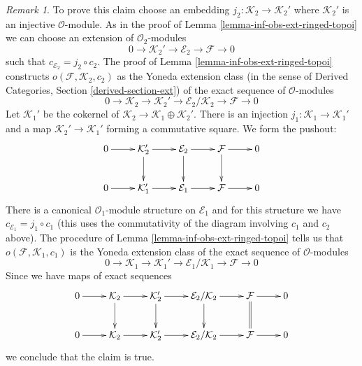 \documentclass{stacks-project}
\theoremstyle{plain}
\theoremstyle{definition}
\theoremstyle{remark}
\newtheorem{remark}[subsection]{Remark}
\numberwithin{equation}{subsection}
\begin{document}
\begin{remark}
\medskip\noindent
To prove this claim choose an embedding
$j_2 : \mathcal{K}_2 \to \mathcal{K}_2'$
where $\mathcal{K}_2'$ is an injective $\mathcal{O}$-module.
As in the proof of Lemma \ref{lemma-inf-obs-ext-ringed-topoi}
we can choose an extension of $\mathcal{O}_2$-modules
$$
0 \to \mathcal{K}_2' \to \mathcal{E}_2 \to \mathcal{F} \to 0
$$
such that $c_{\mathcal{E}_2} = j_2 \circ c_2$.
The proof of Lemma \ref{lemma-inf-obs-ext-ringed-topoi} constructs
$o(\mathcal{F}, \mathcal{K}_2, c_2)$
as the Yoneda extension class (in the sense of
Derived Categories, Section \ref{derived-section-ext})
of the exact sequence of $\mathcal{O}$-modules
$$
0 \to
\mathcal{K}_2 \to \mathcal{K}_2' \to
\mathcal{E}_2/\mathcal{K}_2 \to
\mathcal{F} \to 0
$$
Let $\mathcal{K}_1'$ be the cokernel of
$\mathcal{K}_2 \to \mathcal{K}_1 \oplus \mathcal{K}_2'$.
There is an injection $j_1 : \mathcal{K}_1 \to \mathcal{K}_1'$
and a map $\mathcal{K}_2' \to \mathcal{K}_1'$ forming
a commutative square. We form the pushout:
$$
\xymatrix{
0 \ar[r] &
\mathcal{K}_2' \ar[r] \ar[d] &
\mathcal{E}_2 \ar[r] \ar[d] &
\mathcal{F} \ar[r] \ar[d] & 0 \\
0 \ar[r] &
\mathcal{K}_1' \ar[r] &
\mathcal{E}_1 \ar[r] &
\mathcal{F} \ar[r] & 0
}
$$
There is a canonical $\mathcal{O}_1$-module structure on
$\mathcal{E}_1$ and for this structure we have
$c_{\mathcal{E}_1} = j_1 \circ c_1$ (this uses the commutativity
of the diagram involving $c_1$ and $c_2$ above).
The procedure of Lemma \ref{lemma-inf-obs-ext-ringed-topoi}
tells us that $o(\mathcal{F}, \mathcal{K}_1, c_1)$
is the Yoneda extension class of the exact sequence
of $\mathcal{O}$-modules
$$
0 \to
\mathcal{K}_1 \to
\mathcal{K}_1' \to
\mathcal{E}_1/\mathcal{K}_1 \to
\mathcal{F} \to 0
$$
Since we have maps of exact sequences
$$
\xymatrix{
0 \ar[r] &
\mathcal{K}_2 \ar[d] \ar[r] &
\mathcal{K}_2' \ar[d] \ar[r] &
\mathcal{E}_2/\mathcal{K}_2 \ar[r] \ar[d] &
\mathcal{F} \ar[r] \ar@{=}[d] &
0 \\
0 \ar[r] &
\mathcal{K}_2 \ar[r] &
\mathcal{K}_2' \ar[r] &
\mathcal{E}_2/\mathcal{K}_2 \ar[r] &
\mathcal{F} \ar[r] &
0
}
$$
we conclude that the claim is true.
\end{remark}
\end{document}
